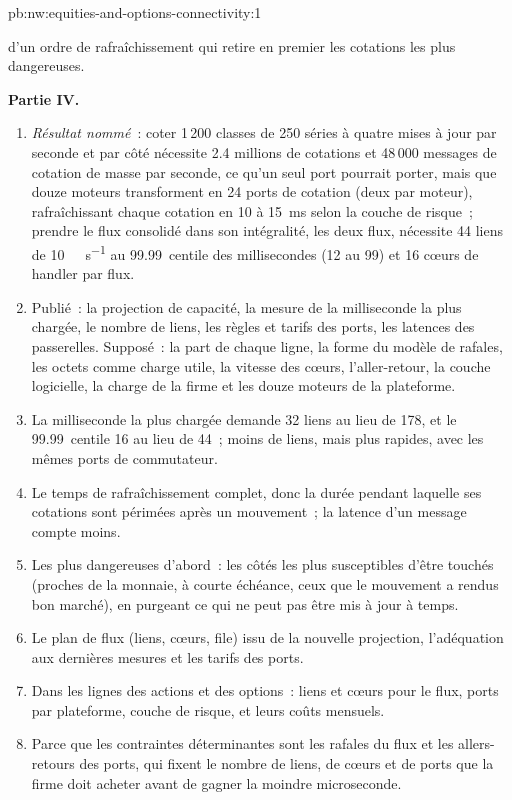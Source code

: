 \begin{solution}{pb:nw:equities-and-options-connectivity:1}
\begin{enumerate}[resume]
  d'un ordre de rafraîchissement qui retire en premier les cotations les plus dangereuses.
\end{enumerate}
\textbf{Partie IV.}
\begin{enumerate}[resume]
\item \emph{Résultat nommé}~: coter 1\,200 classes de 250 séries à quatre mises à jour par seconde et par côté nécessite 2.4 millions de cotations et 48\,000
  messages de cotation de masse par seconde, ce qu'un seul port pourrait porter, mais que douze moteurs transforment en 24 ports de cotation (deux par moteur), rafraîchissant chaque cotation en 10 à \qty{15}{\milli\second} selon la couche de risque~;
  prendre le flux consolidé dans son intégralité, les deux flux, nécessite 44
  liens de \qty{10}{\giga\bit\per\second} au 99.99~centile des millisecondes (12 au 99) et 16 cœurs de handler par flux.
\item Publié~: la projection de capacité, la mesure de la milliseconde la plus chargée, le nombre de liens, les règles et tarifs des ports, les
  latences des passerelles. Supposé~: la part de chaque ligne, la forme du modèle de rafales, les octets comme charge utile, la vitesse des cœurs, l'aller-retour, la couche logicielle, la charge de la firme et les
  douze moteurs de la plateforme.
\item La milliseconde la plus chargée demande 32 liens au lieu de 178, et le 99.99~centile 16 au lieu de 44~; moins de liens, mais plus rapides, avec les
  mêmes ports de commutateur.
\item Le temps de rafraîchissement complet, donc la durée pendant laquelle ses cotations sont périmées après un mouvement~; la latence d'un message compte moins.
\item Les plus dangereuses d'abord~: les côtés les plus susceptibles d'être touchés (proches de la monnaie, à courte échéance, ceux que le mouvement a rendus bon marché), en purgeant ce qui
  ne peut pas être mis à jour à temps.
\item Le plan de flux (liens, cœurs, file) issu de la nouvelle projection, l'adéquation aux dernières mesures et les tarifs des ports.
\item Dans les lignes des actions et des options~: liens et cœurs pour le flux, ports par plateforme, couche de risque, et leurs coûts mensuels.
\item Parce que les contraintes déterminantes sont les rafales du flux et les allers-retours des ports, qui fixent le nombre de liens, de cœurs et de ports que la
  firme doit acheter avant de gagner la moindre microseconde.
\end{enumerate}
\end{solution}

